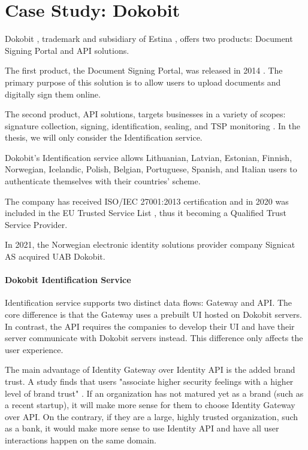 \section{Case Study: Dokobit}

Dokobit \cite{dokobit}, trademark and subsidiary of Estina \cite{euipo-dokobit}, offers two products: Document Signing Portal and API solutions.

The first product, the Document Signing Portal, was released in 2014 \cite{dokobit-aboutus}. The primary purpose of this solution is to allow users to upload documents and digitally sign them online.

The second product, API solutions, targets businesses in a variety of scopes: signature collection, signing, identification, sealing, and TSP monitoring \cite{dokobit}. In the thesis, we will only consider the Identification service.

Dokobit's Identification service allows Lithuanian, Latvian, Estonian, Finnish, Norwegian, Icelandic, Polish, Belgian, Portuguese, Spanish, and Italian \cite{dokobit} users to authenticate themselves with their countries' scheme.

The company has received ISO/IEC 27001:2013 certification \cite{dokobit-certification} and in 2020 was included in the EU Trusted Service List \cite{eu-trustservices, dokobit-aboutus}, thus it becoming a Qualified Trust Service Provider.

In 2021, the Norwegian electronic identity solutions provider company Signicat AS acquired UAB Dokobit.

\paragraph{Dokobit Identification Service}

Identification service supports two distinct data flows: Gateway and API. The core difference is that the Gateway uses a prebuilt UI hosted on Dokobit servers. In contrast, the API requires the companies to develop their UI and have their server communicate with Dokobit servers instead. This difference only affects the user experience.

The main advantage of Identity Gateway over Identity API is the added brand trust. A study finds that users "associate higher security feelings with a higher level of brand trust" \cite{ha2004factors}. If an organization has not matured yet as a brand (such as a recent startup), it will make more sense for them to choose Identity Gateway over API. On the contrary, if they are a large, highly trusted organization, such as a bank, it would make more sense to use Identity API and have all user interactions happen on the same domain.

